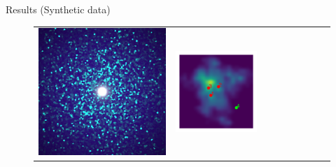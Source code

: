 \documentclass[final]{beamer}
\newlength{\twocolwid}
\newlength{\resultwidth}
\begin{document}
\begin{frame}[t]
\begin{columns}[t]
\begin{column}{\twocolwid}
\begin{block}{Results (Synthetic data)}
\begin{figure}[t]
\begin{tabular}{ccrclcccc}
            		\includegraphics[width=\resultwidth]{synth/flake/optim.jpg} &
            		\includegraphics[width=\resultwidth]{synth/flake/posterior.pdf} &

\end{tabular}
\end{figure}
\end{block}
\end{column}
\end{columns}
\end{frame}
\end{document}
